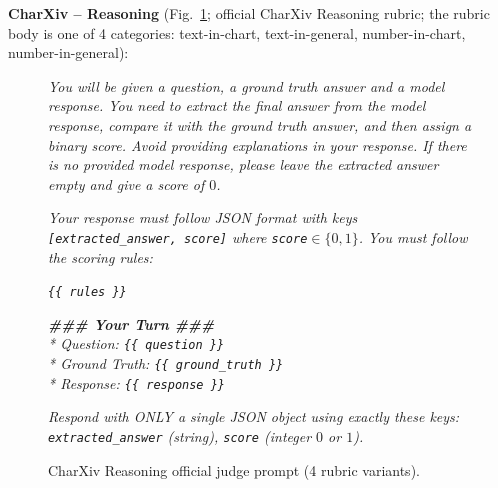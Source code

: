 \textbf{CharXiv -- Reasoning} (Fig.~\ref{fig:prompt-judge-charxiv-r}; official CharXiv Reasoning rubric; the rubric body is one of 4 categories: text-in-chart, text-in-general, number-in-chart, number-in-general):
\begin{figure}[!htbp]
\begin{prompttemplatefig}
\small
\emph{You will be given a question, a ground truth answer and a model response. You need to extract the final answer from the model response, compare it with the ground truth answer, and then assign a binary score. Avoid providing explanations in your response. If there is no provided model response, please leave the extracted answer empty and give a score of $0$.}

\emph{Your response must follow JSON format with keys \texttt{[extracted\_answer, score]} where \texttt{score}$\in\{0,1\}$. You must follow the scoring rules:}

\emph{\texttt{\{\{ rules \}\}}}

\emph{\textbf{\#\#\# Your Turn \#\#\#}\\
* Question: \texttt{\{\{ question \}\}}\\
* Ground Truth: \texttt{\{\{ ground\_truth \}\}}\\
* Response: \texttt{\{\{ response \}\}}}

\emph{Respond with ONLY a single JSON object using exactly these keys: \texttt{extracted\_answer} (string), \texttt{score} (integer $0$ or $1$).}
\end{prompttemplatefig}
\caption{CharXiv Reasoning official judge prompt (4 rubric variants).}
\label{fig:prompt-judge-charxiv-r}
\end{figure}

